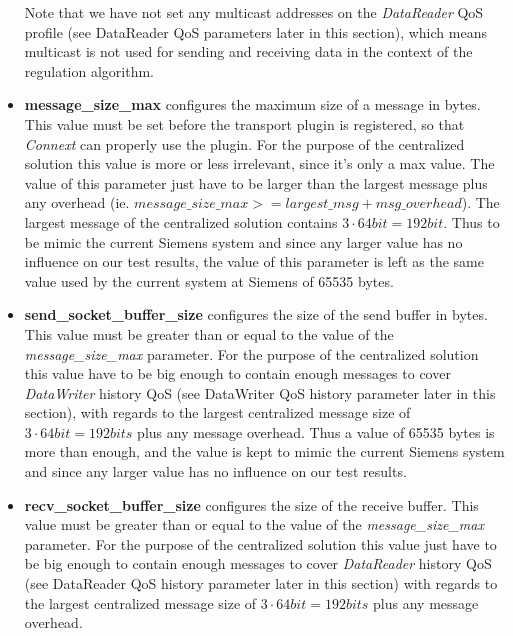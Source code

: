 \begin{itemize}
	Note that we have not set any multicast addresses on the \textit{DataReader} QoS profile (see DataReader QoS parameters later in this section), which means multicast is not used for sending and receiving data in the context of the regulation algorithm.  
	\item \textbf{message\_size\_max} configures the maximum size of a message in bytes. This value must be set before the transport plugin is registered, so that \textit{Connext} can properly use the plugin. For the purpose of the centralized solution this value is more or less irrelevant, since it's only a max value. The value of this parameter just have to be larger than the largest message plus any overhead (ie. $message\_size\_max >= largest\_msg + msg\_overhead$). The largest message of the centralized solution contains $3\cdot64bit=192bit$. Thus to be mimic the current Siemens system and since any larger value has no influence on our test results, the value of this parameter is left as the same value used by the current system at Siemens of 65535 bytes.
	\item \textbf{send\_socket\_buffer\_size} configures the size of the send buffer in bytes. This value must be greater than or equal to the value of the \textit{message\_size\_max} parameter. For the purpose of the centralized solution this value have to be big enough to contain enough messages to cover \textit{DataWriter} history QoS (see DataWriter QoS history parameter later in this section), with regards to the largest centralized message size of $3\cdot64bit=192bits$ plus any message overhead. Thus a value of 65535 bytes is more than enough, and the value is kept to mimic the current Siemens system and since any larger value has no influence on our test results.
	\item \textbf{recv\_socket\_buffer\_size} configures the size of the receive buffer. This value must be greater than or equal to the value of the \textit{message\_size\_max} parameter. For the purpose of the centralized solution this value just have to be big enough to contain enough messages to cover \textit{DataReader} history QoS (see DataReader QoS history parameter later in this section) with regards to the largest centralized message size of $3\cdot64bit=192bits$ plus any message overhead. 
\end{itemize}

